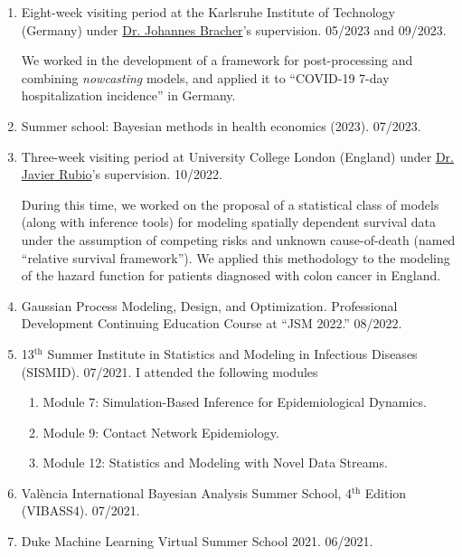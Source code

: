 \documentclass[10pt, ]{article}
\begin{document}
	\begin{enumerate}[noitemsep, topsep=0pt]
		\item Eight-week visiting period at the Karlsruhe Institute of Technology (Germany) under \href{https://jbracher.github.io/}{Dr. Johannes Bracher}'s supervision. 05/2023 and 09/2023.
		
		We worked in the development of a framework for post-processing and combining \textit{nowcasting} models, and applied it to ``COVID-19 7-day hospitalization incidence'' in Germany.
		
		\item Summer school: Bayesian methods in health economics (2023).  07/2023.
		
		\item Three-week visiting period at University College London (England) under \href{https://sites.google.com/site/fjavierrubio67/}{Dr. Javier Rubio}'s supervision. 10/2022.
		
		During this time, we worked on the proposal of a statistical class of models (along with inference tools) for modeling spatially dependent survival data under the assumption of competing risks and unknown cause-of-death (named ``relative survival framework''). We applied this methodology to the modeling of the hazard function for patients diagnosed with colon cancer in England.
		
		
		\item Gaussian Process Modeling, Design, and Optimization. Professional Development Continuing Education Course at ``JSM 2022.'' 08/2022.
		
		\item 13${}^{\text{th}}$ Summer Institute in Statistics and Modeling in Infectious Diseases (SISMID). 07/2021. I attended the following modules \vspace{-6pt}
		\begin{enumerate}[label*=\arabic*., noitemsep]
			\item Module 7: Simulation-Based Inference for Epidemiological Dynamics.
			\item Module 9: Contact Network Epidemiology.
			\item Module 12: Statistics and Modeling with Novel Data Streams.
		\end{enumerate}
		
		\item València International Bayesian Analysis Summer School, 4${}^{\text{th}}$ Edition (VIBASS4). 07/2021.
		
		\item Duke Machine Learning Virtual Summer School 2021. 06/2021.
	\end{enumerate}
	
\end{document}
